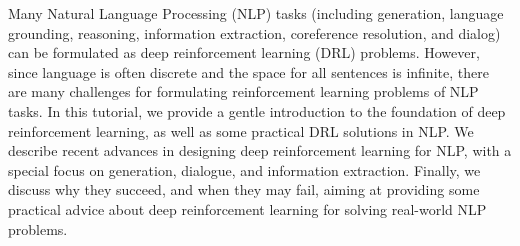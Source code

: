 Many Natural Language Processing (NLP) tasks (including generation, language grounding, reasoning, information extraction, coreference resolution, and dialog) can be formulated as deep reinforcement learning (DRL) problems. However, since language is often discrete and the space for all sentences is infinite, there are many challenges for formulating reinforcement learning problems of NLP tasks. In this tutorial, we provide a gentle introduction to the foundation of deep reinforcement learning, as well as some practical DRL solutions in NLP. We describe recent advances in designing deep reinforcement learning for NLP, with a special focus on generation, dialogue, and information extraction. Finally, we discuss why they succeed, and when they may fail, aiming at providing some practical advice about deep reinforcement learning for solving real-world NLP problems.
